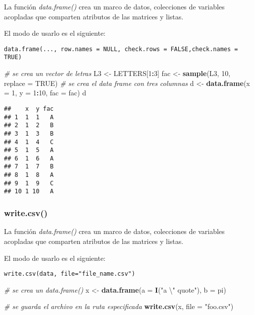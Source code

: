 \documentclass[11pt,]{article}
\newenvironment{Shaded}{\begin{snugshade}}{\end{snugshade}}
\newcommand{\CharTok}[1]{\textcolor[rgb]{0.31,0.60,0.02}{#1}}
\newcommand{\CommentTok}[1]{\textcolor[rgb]{0.56,0.35,0.01}{\textit{#1}}}
\newcommand{\DataTypeTok}[1]{\textcolor[rgb]{0.13,0.29,0.53}{#1}}
\newcommand{\DecValTok}[1]{\textcolor[rgb]{0.00,0.00,0.81}{#1}}
\newcommand{\KeywordTok}[1]{\textcolor[rgb]{0.13,0.29,0.53}{\textbf{#1}}}
\newcommand{\NormalTok}[1]{#1}
\newcommand{\OperatorTok}[1]{\textcolor[rgb]{0.81,0.36,0.00}{\textbf{#1}}}
\newcommand{\OtherTok}[1]{\textcolor[rgb]{0.56,0.35,0.01}{#1}}
\newcommand{\StringTok}[1]{\textcolor[rgb]{0.31,0.60,0.02}{#1}}
\begin{document}
La función \emph{data.frame()} crea un marco de datos, colecciones de
variables acopladas que comparten atributos de las matrices y listas.

El modo de usarlo es el siguiente:

\begin{verbatim}
data.frame(..., row.names = NULL, check.rows = FALSE,check.names = TRUE)
\end{verbatim}

\begin{Shaded}
\begin{Highlighting}[]
\CommentTok{# se crea un vector de letras}
\NormalTok{L3 <-}\StringTok{ }\NormalTok{LETTERS[}\DecValTok{1}\OperatorTok{:}\DecValTok{3}\NormalTok{]}
\NormalTok{fac <-}\StringTok{ }\KeywordTok{sample}\NormalTok{(L3, }\DecValTok{10}\NormalTok{, }\DataTypeTok{replace =} \OtherTok{TRUE}\NormalTok{)}
\CommentTok{# se crea el data frame con tres columnas}
\NormalTok{d <-}\StringTok{ }\KeywordTok{data.frame}\NormalTok{(}\DataTypeTok{x =} \DecValTok{1}\NormalTok{, }\DataTypeTok{y =} \DecValTok{1}\OperatorTok{:}\DecValTok{10}\NormalTok{, }\DataTypeTok{fac =}\NormalTok{ fac)}
\NormalTok{d}
\end{Highlighting}
\end{Shaded}

\begin{verbatim}
##    x  y fac
## 1  1  1   A
## 2  1  2   B
## 3  1  3   B
## 4  1  4   C
## 5  1  5   A
## 6  1  6   A
## 7  1  7   B
## 8  1  8   A
## 9  1  9   C
## 10 1 10   A
\end{verbatim}

\hypertarget{write.csv}{%
\subsubsection{write.csv()}\label{write.csv}}

La función \emph{data.frame()} crea un marco de datos, colecciones de
variables acopladas que comparten atributos de las matrices y listas.

El modo de usarlo es el siguiente:

\begin{verbatim}
write.csv(data, file="file_name.csv")
\end{verbatim}

\begin{Shaded}
\begin{Highlighting}[]
\CommentTok{# se crea un data.frame()}
\NormalTok{x <-}\StringTok{ }\KeywordTok{data.frame}\NormalTok{(}\DataTypeTok{a =} \KeywordTok{I}\NormalTok{(}\StringTok{"a }\CharTok{\textbackslash{}"}\StringTok{ quote"}\NormalTok{), }\DataTypeTok{b =}\NormalTok{ pi)}

\CommentTok{# se guarda el archivo en la ruta especificada}
\KeywordTok{write.csv}\NormalTok{(x, }\DataTypeTok{file =} \StringTok{"foo.csv"}\NormalTok{)}
\end{Highlighting}
\end{Shaded}

\newpage
\singlespacing 
\end{document}
